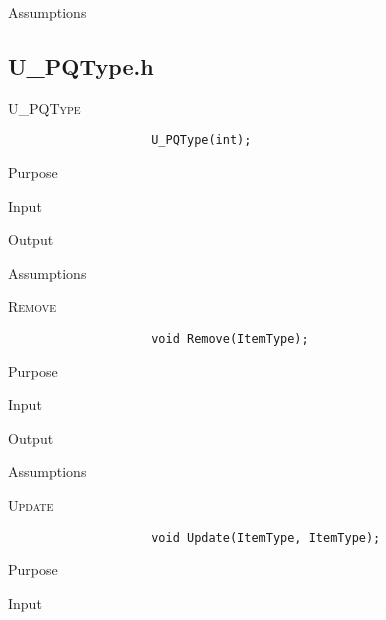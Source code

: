 \documentclass[pdftex, 12pt]{article}
\begin{document}
\begin{description}
\begin{description}
\begin{description}
\begin{description}
					\item{Assumptions}

				\end{description}
		\end{description}
		\subsection{U_PQType.h}
		\begin{description}

			\item{\textsc{U_PQType}}
				\begin{lstlisting}
					U_PQType(int);
				\end{lstlisting}
				\begin{description}

					\item{Purpose}

					\item{Input}

					\item{Output}

					\item{Assumptions}

				\end{description}
			\item{\textsc{Remove}}
				\begin{lstlisting}
					void Remove(ItemType);
				\end{lstlisting}
				\begin{description}

					\item{Purpose}

					\item{Input}

					\item{Output}

					\item{Assumptions}

				\end{description}
			\item{\textsc{Update}}
				\begin{lstlisting}
					void Update(ItemType, ItemType);
				\end{lstlisting}
				\begin{description}

					\item{Purpose}

					\item{Input}


\end{description}
\end{description}
\end{description}
\end{description}
\end{document}
